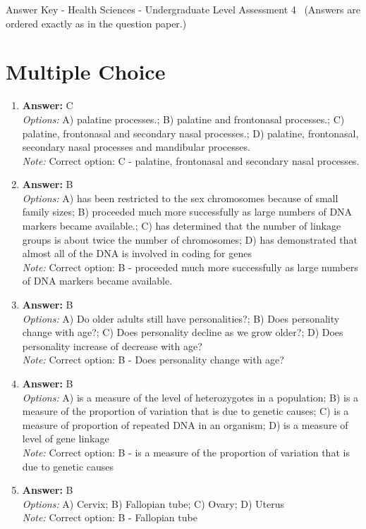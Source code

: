 \documentclass[12pt]{article}
\begin{document}
\begin{center}
Answer Key - Health Sciences - Undergraduate Level Assessment 4 \
\small (Answers are ordered exactly as in the question paper.)
\end{center}

\section*{Multiple Choice}
\begin{enumerate}[label=\arabic*.]
\item \textbf{Answer:} C
\\ \textit{Options:} A) palatine processes.; B) palatine and frontonasal processes.; C) palatine, frontonasal and secondary nasal processes.; D) palatine, frontonasal, secondary nasal processes and mandibular processes.
\\ \textit{Note:} Correct option: C - palatine, frontonasal and secondary nasal processes.
\item \textbf{Answer:} B
\\ \textit{Options:} A) has been restricted to the sex chromosomes because of small family sizes; B) proceeded much more successfully as large numbers of DNA markers became available.; C) has determined that the number of linkage groups is about twice the number of chromosomes; D) has demonstrated that almost all of the DNA is involved in coding for genes
\\ \textit{Note:} Correct option: B - proceeded much more successfully as large numbers of DNA markers became available.
\item \textbf{Answer:} B
\\ \textit{Options:} A) Do older adults still have personalities?; B) Does personality change with age?; C) Does personality decline as we grow older?; D) Does personality increase of decrease with age?
\\ \textit{Note:} Correct option: B - Does personality change with age?
\item \textbf{Answer:} B
\\ \textit{Options:} A) is a measure of the level of heterozygotes in a population; B) is a measure of the proportion of variation that is due to genetic causes; C) is a measure of proportion of repeated DNA in an organism; D) is a measure of level of gene linkage
\\ \textit{Note:} Correct option: B - is a measure of the proportion of variation that is due to genetic causes
\item \textbf{Answer:} B
\\ \textit{Options:} A) Cervix; B) Fallopian tube; C) Ovary; D) Uterus
\\ \textit{Note:} Correct option: B - Fallopian tube
\end{enumerate}
\end{document}
